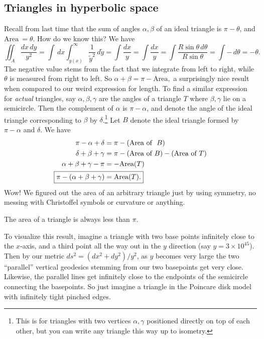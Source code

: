 \subsection{Triangles in hyperbolic space}
Recall from last time that the sum of angles $\alpha ,\beta $ of an ideal triangle is $\pi -\theta$, and $\text{Area} \ =\theta$. How do we know this? We have \[
    \iint_A \frac{dx\, dy}{y^2}=\int  \, dx \int_{y(x)}^{\infty} \frac{1}{\widetilde y^2} \, d\widetilde y=\int \frac{dx}{y} = \int  \frac{dx}{y} = \int \frac{R \sin \theta\, d\theta}{R \sin \theta} =\int  -\, d\theta=-\theta.
\]The negative value stems from the fact that we integrate from left to right, while $\theta$ is measured from right to left. So $\alpha +\beta =\pi - \text{Area},$ a surprisingly nice result when compared to our weird expression for length. To find a similar expression for \emph{actual} triangles, say $\alpha ,\beta ,\gamma $ are the angles of a triangle $T$ where $\beta ,\gamma $ lie on a semicircle. Then the complement of $\alpha $ is $\pi -\alpha $, and denote the angle of the ideal triangle corresponding to $\beta $ by $\delta $.\footnote{This is for triangles with two vertices $\alpha, \gamma $ positioned directly on top of each other, but you can write any triangle this way up to isometry.} Let $B$ denote the ideal triangle formed by $\pi -\alpha $ and $\delta $. We have 
\begin{align*}
    \pi -\alpha +\delta &= \pi - (\text{Area of } \ B)\\
    \delta +\beta +\gamma &=\pi -(\text{Area of} \ B)-(\text{Area of} \ T)\\
    \alpha +\beta +\gamma -\pi &= -\text{Area} (T)\\
    \Aboxed{ \pi-(\alpha +\beta +\gamma )&=\text{Area}(T).}
\end{align*}Wow! We figured out the area of an arbitrary triangle just by using symmetry, no messing with Christoffel symbols or curvature or anything.
\begin{cor}
    The area of a triangle is always less than $ \pi.$
\end{cor}
To visualize this result, imagine a triangle with two base points infinitely close to the $x$-axis, and a third point all the way out in the $y$ direction (say $y=3\times 10^{45}$). Then by our metric $ds ^2=(dx ^2+dy^2)/ y^2$, as $y$ becomes very large the two ``parallel'' vertical geodesics stemming from our two basepoints get very close. Likewise, the parallel lines get infinitely close to the endpoints of the semicircle connecting the basepoints. So just imagine a triangle in the Poincare disk model with infinitely tight pinched edges.

